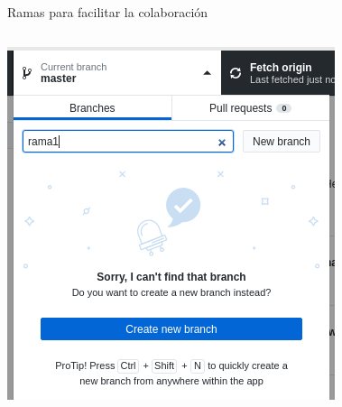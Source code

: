 \documentclass[xcolor={usenames,svgnames,dvipsnames}]{beamer}
\begin{document}
\begin{frame}[label={sec:org9514780}]{Ramas para facilitar la colaboración}
\begin{columns}
\begin{column}{0.4\columnwidth}
\begin{center}
\includegraphics[width=.9\linewidth]{figs/nueva_rama_desktop.png}
\end{center}
\end{column}
\end{columns}
\end{frame}
\end{document}
